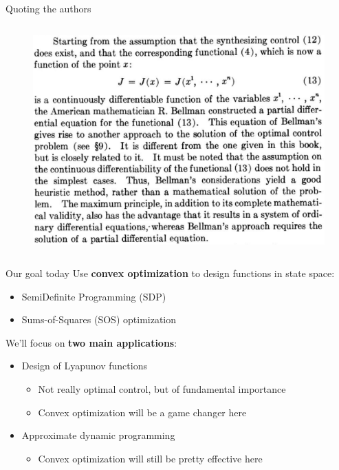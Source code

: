 \documentclass[aspectratio=169]{beamer}
\begin{document}
\begin{frame}{Quoting the authors}
\begin{columns}
\begin{figure}[h]
\includegraphics[width=.9\columnwidth]{figures/pontryagin_quote.png}
\end{figure}
\end{columns}
\end{frame}

\begin{frame}{Our goal today}
Use \textbf{convex optimization} to design functions in state space:
\begin{itemize}
\item
SemiDefinite Programming (SDP)
\item
Sums-of-Squares (SOS) optimization
\end{itemize}

We'll focus on \textbf{two main applications}:
\begin{itemize}
\item
Design of Lyapunov functions
\begin{itemize}
\item
Not really optimal control, but of fundamental importance
\item
Convex optimization will be a game changer here
\end{itemize}
\item
Approximate dynamic programming
\begin{itemize}
\item
Convex optimization will still be pretty effective here
\end{itemize}
\end{itemize}
\end{frame}
\end{document}
